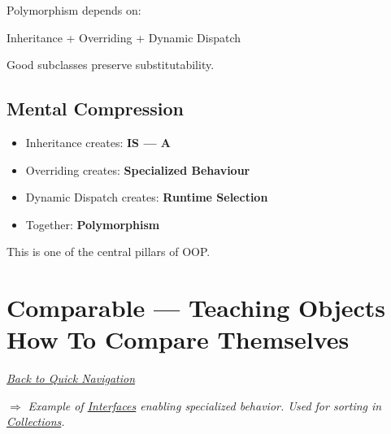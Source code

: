 \documentclass[11pt,a4paper]{book}
\begin{document}
\begin{rosettarule}

Polymorphism depends on:

Inheritance
+
Overriding
+
Dynamic Dispatch

\end{rosettarule}

\begin{rosettarule}

Good subclasses preserve substitutability.

\end{rosettarule}


\section{Mental Compression}
\begin{itemize}
\item Inheritance creates: \textbf{IS --- A}

\item Overriding creates: \textbf{Specialized Behaviour}

\item Dynamic Dispatch creates: \textbf{Runtime Selection}

\item Together: \textbf{\textcolor{RosettaRoyalPurple}{Polymorphism}}
\end{itemize}
This is one of the central pillars of OOP.\@
\chapter[Comparable]{Comparable --- Teaching Objects How To Compare Themselves}

\smallskip
\noindent
\hyperref[sec:quick_nav]{\emph{Back to Quick Navigation}}

\smallskip
\noindent
\textcolor{RosettaRoyalPurple}{$\Rightarrow$}
\emph{Example of \hyperref[chap:interfaces]{Interfaces} enabling specialized behavior. Used for sorting in \hyperref[chap:collections]{Collections}.}
\end{document}
